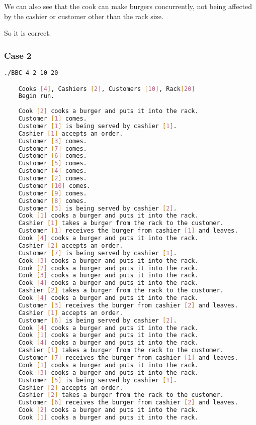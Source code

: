 We can also see that the cook can make burgers concurrently, not being affected by the cashier or customer other than the rack size.

So it is correct.

\subsubsection{Case 2}
\begin{lstlisting}[language=bash]
    ./BBC 4 2 10 20

    Cooks [4], Cashiers [2], Customers [10], Rack[20]
    Begin run.
    
    Cook [2] cooks a burger and puts it into the rack.
    Customer [1] comes.
    Customer [1] is being served by cashier [1].
    Cashier [1] accepts an order.
    Customer [3] comes.
    Customer [7] comes.
    Customer [6] comes.
    Customer [5] comes.
    Customer [4] comes.
    Customer [2] comes.
    Customer [10] comes.
    Customer [9] comes.
    Customer [8] comes.
    Customer [3] is being served by cashier [2].
    Cook [1] cooks a burger and puts it into the rack.
    Cashier [1] takes a burger from the rack to the customer.
    Customer [1] receives the burger from cashier [1] and leaves.
    Cook [4] cooks a burger and puts it into the rack.
    Cashier [2] accepts an order.
    Customer [7] is being served by cashier [1].
    Cook [3] cooks a burger and puts it into the rack.
    Cook [2] cooks a burger and puts it into the rack.
    Cook [3] cooks a burger and puts it into the rack.
    Cook [4] cooks a burger and puts it into the rack.
    Cashier [2] takes a burger from the rack to the customer.
    Cook [4] cooks a burger and puts it into the rack.
    Customer [3] receives the burger from cashier [2] and leaves.
    Cashier [1] accepts an order.
    Customer [6] is being served by cashier [2].
    Cook [4] cooks a burger and puts it into the rack.
    Cook [1] cooks a burger and puts it into the rack.
    Cook [4] cooks a burger and puts it into the rack.
    Cashier [1] takes a burger from the rack to the customer.
    Customer [7] receives the burger from cashier [1] and leaves.
    Cook [1] cooks a burger and puts it into the rack.
    Cook [3] cooks a burger and puts it into the rack.
    Customer [5] is being served by cashier [1].
    Cashier [2] accepts an order.
    Cashier [2] takes a burger from the rack to the customer.
    Customer [6] receives the burger from cashier [2] and leaves.
    Cook [2] cooks a burger and puts it into the rack.
    Cook [1] cooks a burger and puts it into the rack.

\end{lstlisting}
